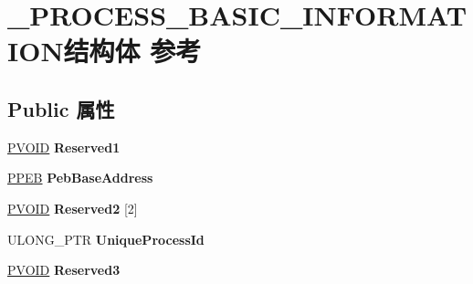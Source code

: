 \hypertarget{struct___p_r_o_c_e_s_s___b_a_s_i_c___i_n_f_o_r_m_a_t_i_o_n}{}\section{\+\_\+\+P\+R\+O\+C\+E\+S\+S\+\_\+\+B\+A\+S\+I\+C\+\_\+\+I\+N\+F\+O\+R\+M\+A\+T\+I\+O\+N结构体 参考}
\label{struct___p_r_o_c_e_s_s___b_a_s_i_c___i_n_f_o_r_m_a_t_i_o_n}
\subsection*{Public 属性}
\begin{DoxyCompactItemize}
\item 
\mbox{\label{struct___p_r_o_c_e_s_s___b_a_s_i_c___i_n_f_o_r_m_a_t_i_o_n_ac25372bf10c8a8ebac9d189bc0e6ecdc}} 
\hyperlink{interfacevoid}{P\+V\+O\+ID} {\bfseries Reserved1}
\item 
\mbox{\label{struct___p_r_o_c_e_s_s___b_a_s_i_c___i_n_f_o_r_m_a_t_i_o_n_a0e16d6208b60ee422a60c8b02b2ead6b}} 
\hyperlink{struct___p_e_b}{P\+P\+EB} {\bfseries Peb\+Base\+Address}
\item 
\mbox{\label{struct___p_r_o_c_e_s_s___b_a_s_i_c___i_n_f_o_r_m_a_t_i_o_n_af0640c406abdae76ec7e3c50cf8de038}} 
\hyperlink{interfacevoid}{P\+V\+O\+ID} {\bfseries Reserved2} \mbox{[}2\mbox{]}
\item 
\mbox{\label{struct___p_r_o_c_e_s_s___b_a_s_i_c___i_n_f_o_r_m_a_t_i_o_n_afe6e56b5ae0aff9044ee218c86f59f2d}} 
U\+L\+O\+N\+G\+\_\+\+P\+TR {\bfseries Unique\+Process\+Id}
\item 
\mbox{\label{struct___p_r_o_c_e_s_s___b_a_s_i_c___i_n_f_o_r_m_a_t_i_o_n_a88b84e8b2c7f6c241ea9e20e8376abaf}} 
\hyperlink{interfacevoid}{P\+V\+O\+ID} {\bfseries Reserved3}
\item 
\mbox{\label{struct___p_r_o_c_e_s_s___b_a_s_i_c___i_n_f_o_r_m_a_t_i_o_n_a706f0aa09b133c05d17f97092a81cada}} 

\end{DoxyCompactItemize}
